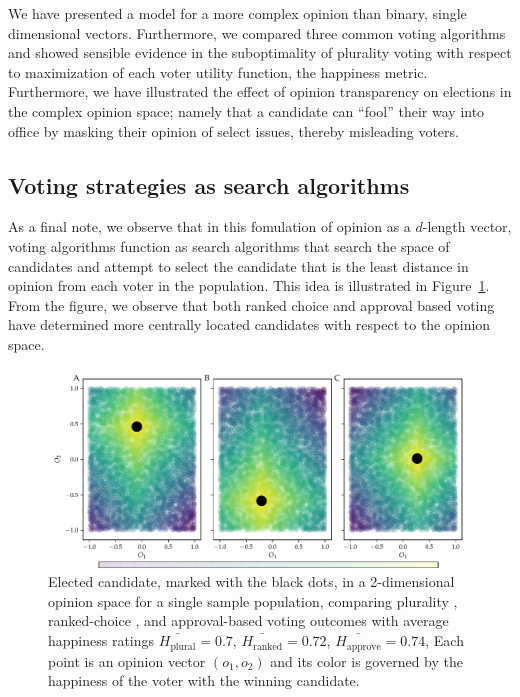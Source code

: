 We have presented a model for a more complex opinion than binary, single dimensional vectors. Furthermore, we compared three
common voting algorithms and showed sensible evidence in the suboptimality of plurality voting with respect to maximization
of each voter utility function, the happiness metric.
Furthermore, we have illustrated the effect of opinion transparency on elections in the complex opinion space;
namely that a candidate can ``fool''
their way into office by masking their opinion of select issues, thereby misleading voters.

\subsection{Voting strategies as search algorithms}
As a final note, we observe that in this fomulation of opinion as a $d$-length vector, voting algorithms function as search algorithms
that search the space of candidates and attempt to select the candidate that is the least distance in opinion from each voter
in the population.  This idea is illustrated in Figure~\ref{fig:plurality_vs_rc_anecdotal}. From the figure, we observe that both
ranked choice and approval based voting have determined more centrally located candidates with respect to the opinion space.
\begin{figure}
\includegraphics[width=1\textwidth]{figs/rc-gen_anecdotal_comparison-2D.pdf}\vspace{-3mm}
\caption{Elected candidate, marked with the black dots, in a 2-dimensional opinion space for a single sample population, comparing plurality ,
ranked-choice , and approval-based  voting outcomes with average happiness ratings
$\bar{H_{\mathrm{plural}}}=0.7$, $\bar{H_{\mathrm{ranked}}}=0.72$, $\bar{H_{\mathrm{approve}}}=0.74$,
Each point is an opinion vector $(o_1, o_2)$ and its color is governed by the happiness of the voter with the winning candidate.}
\label{fig:plurality_vs_rc_anecdotal}
\end{figure}
